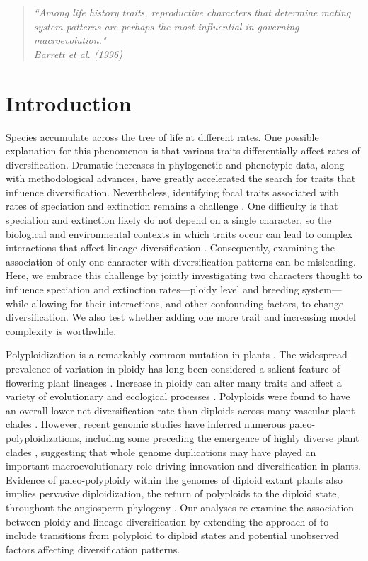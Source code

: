 \begin{quote}
\em{``Among life history traits, reproductive characters that determine mating system patterns are perhaps the most influential in governing macroevolution." 
}
\\
\hspace*{\fill}\rm{ Barrett et al. (1996)}
\end{quote}

\section{Introduction}

Species accumulate across the tree of life at different rates. 
One possible explanation for this phenomenon is that various traits differentially affect rates of diversification. 
Dramatic increases in phylogenetic and phenotypic data, along with methodological advances, have greatly accelerated the search for traits that influence diversification.
Nevertheless, identifying focal traits associated with rates of speciation and extinction remains a challenge \citep[\eg][]{maddison_2015, rabosky_2015, beaulieu_2016, rabosky_2017}. 
One difficulty is that speciation and extinction likely do not depend on a single character, so the biological and environmental contexts in which traits occur can lead to complex interactions that affect lineage diversification \citep{beaulieu_2016, caetano_2018, herrera_2018}.
Consequently, examining the association of only one character with diversification patterns can be misleading. 
Here, we embrace this challenge by jointly investigating two characters thought to influence speciation and extinction rates---ploidy level and breeding system---while allowing for their interactions, and other confounding factors, to change diversification. 
We also test whether adding one more trait and increasing model complexity is worthwhile.

Polyploidization is a remarkably common mutation in plants \citep{husband_2013, zenilferguson_2017}.
The widespread prevalence of variation in ploidy has long been considered a salient feature of flowering plant lineages \citep{stebbins1938}. 
Increase in ploidy can alter many traits and affect a variety of evolutionary and ecological processes \citep{ramsey_2002, sessa_2019}.
Polyploids were found to have an overall lower net diversification rate than diploids across many vascular plant clades \citep{mayrose_2011, mayrose_2015}. 
However, recent genomic studies have inferred numerous paleo-polyploidizations, including some preceding the emergence of highly diverse plant clades \citep{soltis_2014, landis_2018}, suggesting that whole genome duplications may have played an important macroevolutionary role driving innovation and diversification in plants. 
Evidence of paleo-polyploidy within the genomes of diploid extant plants also implies pervasive diploidization, the return of polyploids to the diploid state, throughout the angiosperm phylogeny \citep{soltis_2015, dodsworth_2015}.
Our analyses re-examine the association between ploidy and lineage diversification by extending the approach of \citet{mayrose_2011, mayrose_2015} to include transitions from polyploid to diploid states and potential unobserved factors affecting diversification patterns.

